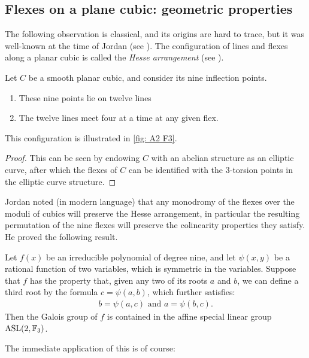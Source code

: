 \documentclass[11pt]{amsart}
\providecommand{\ASL}{\mathrm{ASL}}
\begin{document}
\subsection{Flexes on a plane cubic: geometric properties}

The following observation is classical, and its origins are hard to trace, but it was well-known at the time of Jordan (see \cite[p.~302]{Jordan}). The configuration of lines and flexes along a planar cubic is called the \textit{Hesse arrangement} (see \cite[p.~118]{Dolgachev}).

\begin{proposition} Let $C$ be a smooth planar cubic, and consider its nine inflection points.
\begin{enumerate}
    \item These nine points lie on twelve lines
    \item The twelve lines meet four at a time at any given flex.
\end{enumerate}
This configuration is illustrated in \autoref{fig: A2 F3}.
\end{proposition}
\begin{proof} This can be seen by endowing $C$ with an abelian structure as an elliptic curve, after which the flexes of $C$ can be identified with the $3$-torsion points in the elliptic curve structure.
\end{proof}

Jordan noted (in modern language) that any monodromy of the flexes over the moduli of cubics will preserve the Hesse arrangement, in particular the resulting permutation of the nine flexes will preserve the colinearity properties they satisfy. He proved the following result.

\begin{theorem} Let $f(x)$ be an irreducible polynomial of degree nine, and let $\psi(x,y)$ be a rational function of two variables, which is symmetric in the variables. Suppose that $f$ has the property that, given any two of its roots $a$ and $b$, we can define a third root by the formula $c = \psi(a,b)$, which further satisfies:
\begin{align*}
    b = \psi(a,c) \text{ and } a = \psi(b,c).
\end{align*}
Then the Galois group of $f$ is contained in the affine special linear group $\ASL(2,\F_3)$.
\end{theorem}

The immediate application of this is of course:
\end{document}
